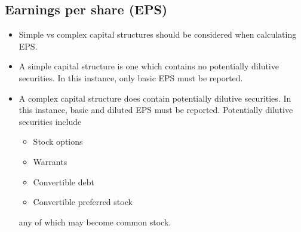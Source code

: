 \documentclass[../notes_compiled.tex]{subfiles}
\begin{document}
\subsection{Earnings per share (EPS)}
\begin{itemize}
\item Simple vs complex capital structures should be considered when calculating EPS.
\item A simple capital structure is one which contains no potentially dilutive securities. In this instance, only basic EPS must be reported.
\item A complex capital structure does contain potentially dilutive securities. In this instance, basic and diluted EPS must be reported. Potentially dilutive securities include
\begin{itemize}
\item Stock options
\item Warrants
\item Convertible debt
\item Convertible preferred stock
\end{itemize}
any of which may become common stock.
\end{itemize}
\end{document}

